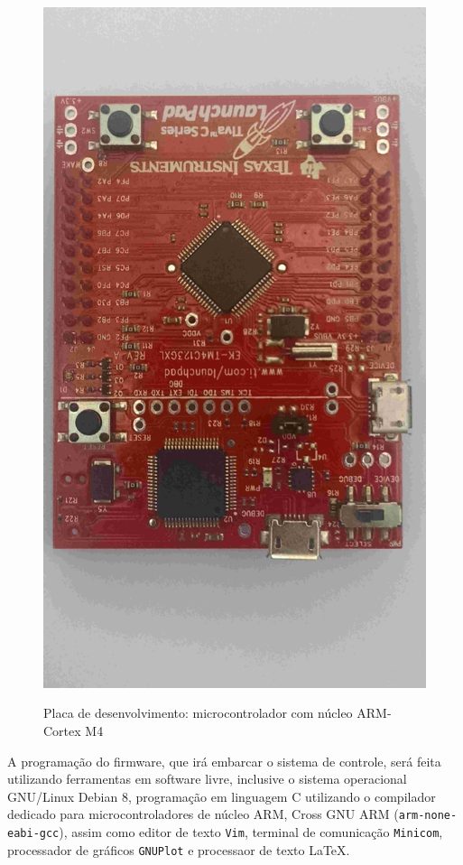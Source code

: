 \begin{figure}[!htb]
\caption{Placa de desenvolvimento: microcontrolador com núcleo ARM-Cortex M4}
\center\includegraphics[scale=0.08, angle=180, clip=true, trim=0 750 60 500]{./imagens/uC-ARM.jpg}
\label{fig:uCarm}
\end{figure}

A programação do firmware, que irá embarcar o sistema de controle, será feita utilizando ferramentas em software livre, inclusive o sistema operacional GNU/Linux Debian 8, programação em linguagem C utilizando o compilador dedicado para microcontroladores de núcleo ARM, Cross GNU ARM (\texttt{arm-none-eabi-gcc}), assim como editor de texto \texttt{Vim}, terminal de comunicação \texttt{Minicom}, processador de gráficos \texttt{GNUPlot} e processaor de texto \LaTeX.








